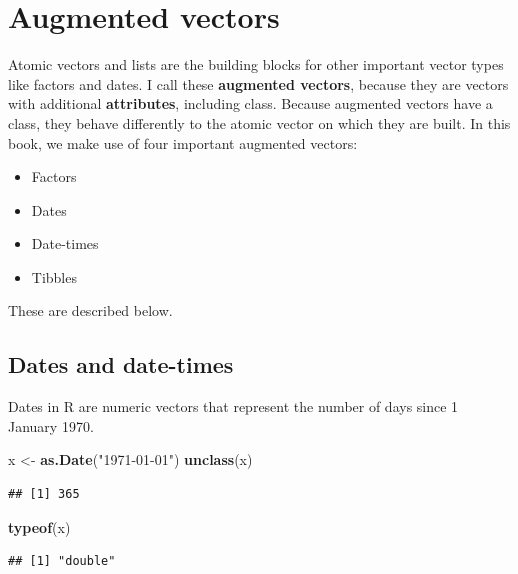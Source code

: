 \documentclass[
]{book}
\newenvironment{Shaded}{\begin{snugshade}}{\end{snugshade}}
\newcommand{\KeywordTok}[1]{\textcolor[rgb]{0.13,0.29,0.53}{\textbf{#1}}}
\newcommand{\NormalTok}[1]{#1}
\newcommand{\StringTok}[1]{\textcolor[rgb]{0.31,0.60,0.02}{#1}}
\providecommand{\tightlist}{%
  \setlength{\itemsep}{0pt}\setlength{\parskip}{0pt}}
\begin{document}
\hypertarget{augmented-vectors}{%
\section{Augmented vectors}\label{augmented-vectors}}

Atomic vectors and lists are the building blocks for other important vector types like factors and dates.
I call these \textbf{augmented vectors}, because they are vectors with additional \textbf{attributes}, including class.
Because augmented vectors have a class, they behave differently to the atomic vector on which they are built.
In this book, we make use of four important augmented vectors:

\begin{itemize}
\tightlist
\item
  Factors
\item
  Dates
\item
  Date-times
\item
  Tibbles
\end{itemize}

These are described below.

\hypertarget{dates-and-date-times}{%
\subsection{Dates and date-times}\label{dates-and-date-times}}

Dates in R are numeric vectors that represent the number of days since 1 January 1970.

\begin{Shaded}
\begin{Highlighting}[]
\NormalTok{x <-}\StringTok{ }\KeywordTok{as.Date}\NormalTok{(}\StringTok{"1971-01-01"}\NormalTok{)}
\KeywordTok{unclass}\NormalTok{(x)}
\end{Highlighting}
\end{Shaded}

\begin{verbatim}
## [1] 365
\end{verbatim}

\begin{Shaded}
\begin{Highlighting}[]
\KeywordTok{typeof}\NormalTok{(x)}
\end{Highlighting}
\end{Shaded}

\begin{verbatim}
## [1] "double"
\end{verbatim}
\end{document}
